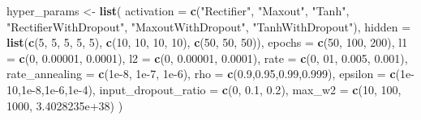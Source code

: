 \documentclass[]{article}
\newenvironment{Shaded}{\begin{snugshade}}{\end{snugshade}}
\newcommand{\KeywordTok}[1]{\textcolor[rgb]{0.13,0.29,0.53}{\textbf{{#1}}}}
\newcommand{\DataTypeTok}[1]{\textcolor[rgb]{0.13,0.29,0.53}{{#1}}}
\newcommand{\DecValTok}[1]{\textcolor[rgb]{0.00,0.00,0.81}{{#1}}}
\newcommand{\FloatTok}[1]{\textcolor[rgb]{0.00,0.00,0.81}{{#1}}}
\newcommand{\StringTok}[1]{\textcolor[rgb]{0.31,0.60,0.02}{{#1}}}
\newcommand{\NormalTok}[1]{{#1}}
\begin{document}
\begin{Shaded}
\begin{Highlighting}[]
\NormalTok{hyper_params <-}\StringTok{ }\KeywordTok{list}\NormalTok{(}
                     \DataTypeTok{activation =} \KeywordTok{c}\NormalTok{(}\StringTok{"Rectifier"}\NormalTok{, }\StringTok{"Maxout"}\NormalTok{, }\StringTok{"Tanh"}\NormalTok{, }\StringTok{"RectifierWithDropout"}\NormalTok{, }
                                    \StringTok{"MaxoutWithDropout"}\NormalTok{, }\StringTok{"TanhWithDropout"}\NormalTok{), }
                     \DataTypeTok{hidden =} \KeywordTok{list}\NormalTok{(}\KeywordTok{c}\NormalTok{(}\DecValTok{5}\NormalTok{, }\DecValTok{5}\NormalTok{, }\DecValTok{5}\NormalTok{, }\DecValTok{5}\NormalTok{, }\DecValTok{5}\NormalTok{), }\KeywordTok{c}\NormalTok{(}\DecValTok{10}\NormalTok{, }\DecValTok{10}\NormalTok{, }\DecValTok{10}\NormalTok{, }\DecValTok{10}\NormalTok{), }\KeywordTok{c}\NormalTok{(}\DecValTok{50}\NormalTok{, }\DecValTok{50}\NormalTok{, }\DecValTok{50}\NormalTok{)),}
                     \DataTypeTok{epochs =} \KeywordTok{c}\NormalTok{(}\DecValTok{50}\NormalTok{, }\DecValTok{100}\NormalTok{, }\DecValTok{200}\NormalTok{),}
                     \DataTypeTok{l1 =} \KeywordTok{c}\NormalTok{(}\DecValTok{0}\NormalTok{, }\FloatTok{0.00001}\NormalTok{, }\FloatTok{0.0001}\NormalTok{), }
                     \DataTypeTok{l2 =} \KeywordTok{c}\NormalTok{(}\DecValTok{0}\NormalTok{, }\FloatTok{0.00001}\NormalTok{, }\FloatTok{0.0001}\NormalTok{),}
                     \DataTypeTok{rate =} \KeywordTok{c}\NormalTok{(}\DecValTok{0}\NormalTok{, }\DecValTok{01}\NormalTok{, }\FloatTok{0.005}\NormalTok{, }\FloatTok{0.001}\NormalTok{),}
                     \DataTypeTok{rate_annealing =} \KeywordTok{c}\NormalTok{(}\FloatTok{1e-8}\NormalTok{, }\FloatTok{1e-7}\NormalTok{, }\FloatTok{1e-6}\NormalTok{),}
                     \DataTypeTok{rho =} \KeywordTok{c}\NormalTok{(}\FloatTok{0.9}\NormalTok{,}\FloatTok{0.95}\NormalTok{,}\FloatTok{0.99}\NormalTok{,}\FloatTok{0.999}\NormalTok{),}
                     \DataTypeTok{epsilon =} \KeywordTok{c}\NormalTok{(}\FloatTok{1e-10}\NormalTok{,}\FloatTok{1e-8}\NormalTok{,}\FloatTok{1e-6}\NormalTok{,}\FloatTok{1e-4}\NormalTok{),}
                     \DataTypeTok{input_dropout_ratio =} \KeywordTok{c}\NormalTok{(}\DecValTok{0}\NormalTok{, }\FloatTok{0.1}\NormalTok{, }\FloatTok{0.2}\NormalTok{),}
                     \DataTypeTok{max_w2 =} \KeywordTok{c}\NormalTok{(}\DecValTok{10}\NormalTok{, }\DecValTok{100}\NormalTok{, }\DecValTok{1000}\NormalTok{, }\FloatTok{3.4028235e+38}\NormalTok{)}
                     \NormalTok{)}
\end{Highlighting}
\end{Shaded}
\end{document}
